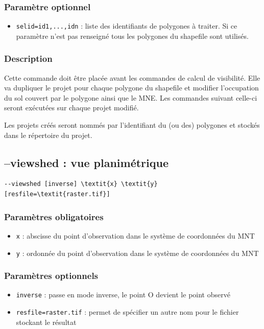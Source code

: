 \documentclass{report}
\begin{document}
\subsubsection{Paramètre optionnel}
\begin{itemize}
	\item \verb|selid=id1,...,idn| : liste des identifiants de polygones à traiter. Si ce paramètre n'est pas renseigné tous les polygones du shapefile sont utilisés.
\end{itemize}

\subsubsection{Description}
Cette commande doit être placée avant les commandes de calcul de visibilité. Elle va dupliquer le projet pour chaque polygone du shapefile et modifier l'occupation du sol couvert par le polygone ainsi que le MNE. Les commandes suivant celle-ci seront exécutées sur chaque projet modifié.

Les projets créés seront nommés par l'identifiant du (ou des) polygones et stockés dans le répertoire du projet.

\subsection{--viewshed : vue planimétrique}
\begin{Verbatim}[commandchars=\\\{\}]
--viewshed [inverse] \textit{x} \textit{y} [resfile=\textit{raster.tif}]
\end{Verbatim}

\subsubsection{Paramètres obligatoires}
\begin{itemize}
	\item \verb|x| : abscisse du point d'observation dans le système de coordonnées du MNT
	\item \verb|y| : ordonnée du point d'observation dans le système de coordonnées du MNT
\end{itemize}

\subsubsection{Paramètres optionnels}
\begin{itemize}
	\item \verb|inverse| : passe en mode inverse, le point O devient le point observé
	\item \verb|resfile=raster.tif| : permet de spécifier un autre nom pour le fichier stockant le résultat
\end{itemize}
\end{document}
